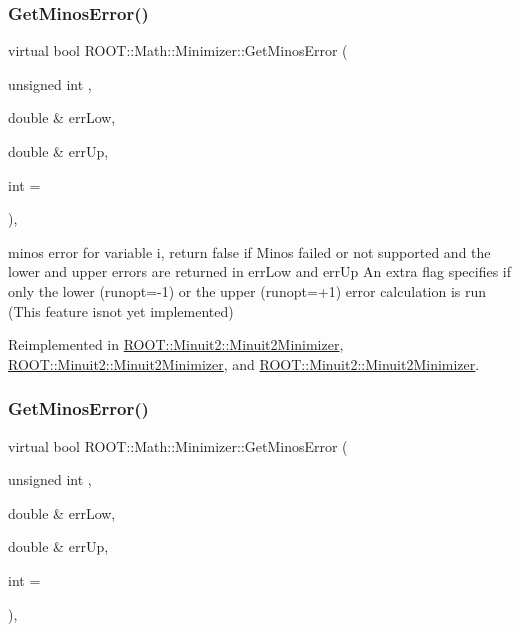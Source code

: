 \mbox{\label{classROOT_1_1Math_1_1Minimizer_aeaef75b766eff7088939259c842ab056}} 
\subsubsection{\texorpdfstring{GetMinosError()}{GetMinosError()}\hspace{0.1cm}{\footnotesize\ttfamily [1/3]}}
{\footnotesize\ttfamily virtual bool R\+O\+O\+T\+::\+Math\+::\+Minimizer\+::\+Get\+Minos\+Error (\begin{DoxyParamCaption}\item[{unsigned int}]{,  }\item[{double \&}]{err\+Low,  }\item[{double \&}]{err\+Up,  }\item[{int}]{ = {} }\end{DoxyParamCaption})\hspace{0.3cm}{\ttfamily [inline]}, {\ttfamily [virtual]}}

minos error for variable i, return false if Minos failed or not supported and the lower and upper errors are returned in err\+Low and err\+Up An extra flag specifies if only the lower (runopt=-\/1) or the upper (runopt=+1) error calculation is run (This feature isnot yet implemented) 

Reimplemented in \mbox{\hyperlink{classROOT_1_1Minuit2_1_1Minuit2Minimizer_ab6c27c6f165821774dd304561e8956f5}{R\+O\+O\+T\+::\+Minuit2\+::\+Minuit2\+Minimizer}}, \mbox{\hyperlink{classROOT_1_1Minuit2_1_1Minuit2Minimizer_ab6c27c6f165821774dd304561e8956f5}{R\+O\+O\+T\+::\+Minuit2\+::\+Minuit2\+Minimizer}}, and \mbox{\hyperlink{classROOT_1_1Minuit2_1_1Minuit2Minimizer_ab6c27c6f165821774dd304561e8956f5}{R\+O\+O\+T\+::\+Minuit2\+::\+Minuit2\+Minimizer}}.

\mbox{\label{classROOT_1_1Math_1_1Minimizer_aeaef75b766eff7088939259c842ab056}} 
\subsubsection{\texorpdfstring{GetMinosError()}{GetMinosError()}\hspace{0.1cm}{\footnotesize\ttfamily [2/3]}}
{\footnotesize\ttfamily virtual bool R\+O\+O\+T\+::\+Math\+::\+Minimizer\+::\+Get\+Minos\+Error (\begin{DoxyParamCaption}\item[{unsigned int}]{,  }\item[{double \&}]{err\+Low,  }\item[{double \&}]{err\+Up,  }\item[{int}]{ = {} }\end{DoxyParamCaption})\hspace{0.3cm}{\ttfamily [inline]}, {\ttfamily [virtual]}}


